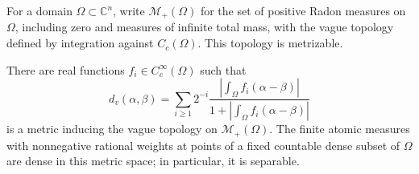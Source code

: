 For a domain $\Omega\subset\mathbb C^n$, write $\mathcal M_+(\Omega)$ for the set of positive Radon measures on $\Omega$, including zero and measures of infinite total mass, with the vague topology defined by integration against $C_c(\Omega)$. This topology is metrizable.

\begin{lemma}\label{lem:local-vague-metric}
There are real functions $f_i\in C_c^\infty(\Omega)$ such that
\[
 d_v(\alpha,\beta)=\sum_{i\geq1}2^{-i}
 \frac{\left|\int_\Omega f_i(\alpha-\beta)\right|}
      {1+\left|\int_\Omega f_i(\alpha-\beta)\right|}
\]
is a metric inducing the vague topology on $\mathcal M_+(\Omega)$. The finite atomic measures with nonnegative rational weights at points of a fixed countable dense subset of $\Omega$ are dense in this metric space; in particular, it is separable.
\end{lemma}
